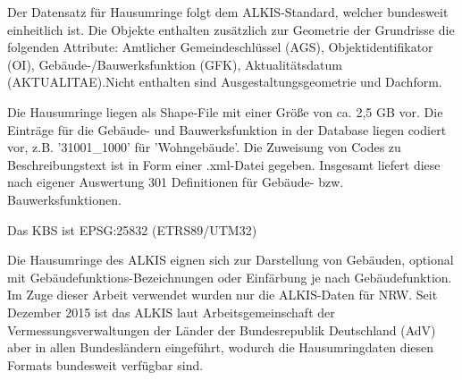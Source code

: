 			Der Datensatz für Hausumringe folgt dem ALKIS-Standard, welcher bundesweit einheitlich ist. Die Objekte enthalten zusätzlich zur Geometrie der Grundrisse die folgenden Attribute: Amtlicher Gemeindeschlüssel (AGS), Objektidentifikator (OI), Gebäude-/Bauwerksfunktion (GFK), Aktualitätsdatum (AKTUALITAE).Nicht enthalten sind Ausgestaltungsgeometrie und Dachform.
			
						
			Die Hausumringe liegen als Shape-File mit einer Größe von ca. 2,5 GB vor. Die Einträge für die Gebäude- und Bauwerksfunktion in der Database liegen codiert vor, z.B. '31001\_1000' für 'Wohngebäude'. Die Zuweisung von Codes zu Beschreibungstext ist in Form einer .xml-Datei gegeben. Insgesamt liefert diese nach eigener Auswertung 301 Definitionen für Gebäude- bzw. Bauwerksfunktionen.  \cite{web_download_alkis_gebaeudefunktion_code_definition}
			
			Das KBS ist EPSG:25832 (ETRS89/UTM32)		
			
			Die Hausumringe des ALKIS eignen sich zur Darstellung von Gebäuden, optional mit Gebäudefunktions-Bezeichnungen oder Einfärbung je nach Gebäudefunktion. Im Zuge dieser Arbeit verwendet wurden nur die ALKIS-Daten für NRW. Seit Dezember 2015 ist das ALKIS laut Arbeitsgemeinschaft der Vermessungsverwaltungen der Länder der Bundesrepublik Deutschland (AdV) aber in allen Bundesländern eingeführt, wodurch die Hausumringdaten diesen Formats bundesweit verfügbar sind. \cite{web_alkis_adv}
		
			
			
					
